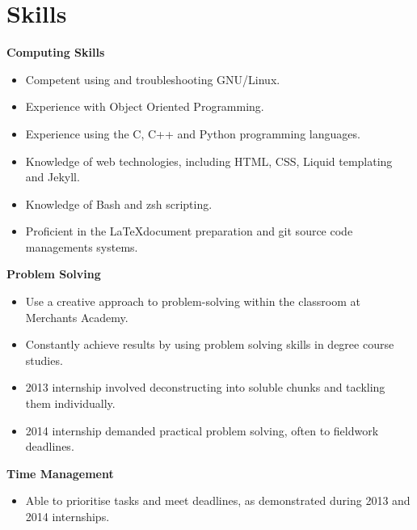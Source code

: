 \documentclass[11pt,a4paper,sans]{moderncv}
\begin{document}
\vspace{2pt}

\newpage

\section{Skills}

{\large\textbf{Computing Skills}}

\begin{itemize}
\item Competent using and troubleshooting GNU/Linux.
\item Experience with Object Oriented Programming.
\item Experience using the C, C++ and Python programming languages.
\item Knowledge of web technologies, including HTML, CSS, Liquid templating and
    Jekyll.
\item Knowledge of Bash and zsh scripting.
\item Proficient in the \LaTeX \space document preparation and git source
    code managements systems.
\end{itemize}

\vspace{1em}

{\large\textbf{Problem Solving}}

\begin{itemize}
\item Use a creative approach to problem-solving within the classroom
    at Merchants Academy.
\item Constantly achieve results by using problem solving skills in degree
    course studies.
\item 2013 internship involved deconstructing into soluble
    chunks and tackling them individually.
\item 2014 internship demanded practical problem solving, often to fieldwork
    deadlines.
\end{itemize}

\vspace{1em}

{\large\textbf{Time Management}}

\begin{itemize}
\item Able to prioritise tasks and meet deadlines, as demonstrated during 2013
    and 2014 internships.
\end{itemize}
\end{document}
